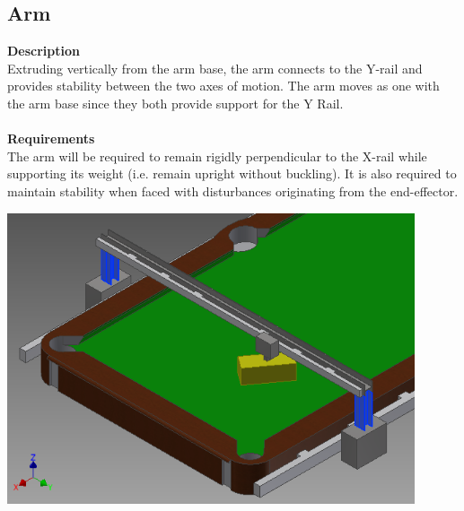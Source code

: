 \documentclass[titlepage]{article}
\begin{document}

\newpage
\subsection{Arm}
\textbf{Description}\\
Extruding vertically from the arm base, the arm connects to the Y-rail and provides stability between the two axes of motion. The arm moves as one with the arm base since they both provide support for the Y Rail.\\~\\
\textbf{Requirements}\\
The arm will be required to remain rigidly perpendicular to the X-rail while supporting its weight (i.e. remain upright without buckling). It is also required to maintain stability when faced with disturbances originating from the end-effector.
\begin{center}
	\includegraphics[width = 0.9\textwidth]{arms.png}	%
\label{fig:armFig}
\end{center}


\end{document}
